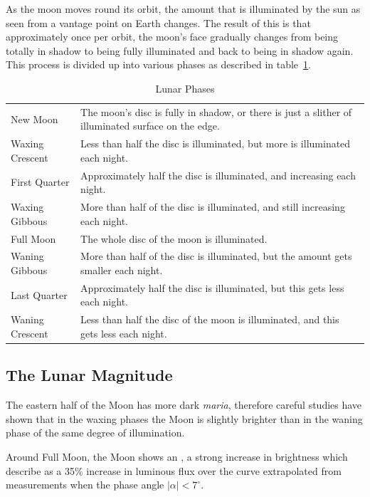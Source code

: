 As the moon moves round its orbit, the amount that is illuminated by the
sun as seen from a vantage point on Earth changes. The result of this is
that approximately once per orbit, the moon's face gradually changes
from being totally in shadow to being fully illuminated and back to
being in shadow again. This process is divided up into various phases as
described in table~\ref{tab:moonphases}.

\begin{table}[tb]
\small
\begin{tabularx}{\textwidth}{l|X}
\toprule
New Moon       & The moon's disc is fully in shadow, or there is just a slither of illuminated surface on the edge.\\
Waxing Crescent& Less than half the disc is illuminated, but more is illuminated each night.\\
First Quarter  & Approximately half the disc is illuminated, and increasing each night.\\
Waxing Gibbous & More than half of the disc is illuminated, and still increasing each night.\\
Full Moon      & The whole disc of the moon is illuminated.\\
Waning Gibbous & More than half of the disc is illuminated, but the amount gets smaller each night.\\
Last Quarter   & Approximately half the disc is illuminated, but this gets less each night.\\
Waning Crescent& Less than half the disc of the moon is illuminated, and this gets less each night.\\
\bottomrule
\end{tabularx}
\caption{Lunar Phases}
\label{tab:moonphases}
\end{table}

\subsection{The Lunar Magnitude}
\label{sec:Moon:magnitude}

The eastern half of the Moon has more dark \emph{maria}, therefore
careful studies \citep{Russell:1916} have shown that in the waxing
phases the Moon is slightly brighter than in the waning phase of the
same degree of illumination.

Around Full Moon, the Moon shows an , a
strong increase in brightness which \citet{Krisciunas-Schaefer:1991}
describe as a 35\% increase in luminous flux over the curve
extrapolated from measurements when the phase angle $|\alpha|<7^\circ$. 

